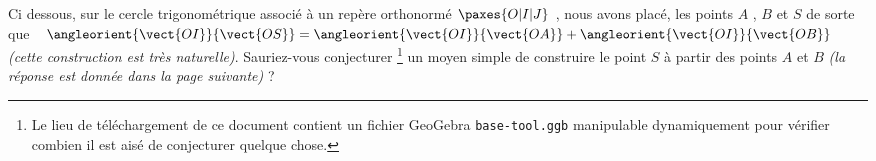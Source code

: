 Ci dessous, sur le cercle trigonométrique associé à un repère orthonormé $\paxes{O | I | J}$ , nous avons placé, les points $A$ , $B$ et $S$ de sorte que $\angleorient{\vect{OI}}{\vect{OS}} = \angleorient{\vect{OI}}{\vect{OA}} + \angleorient{\vect{OI}}{\vect{OB}}$ \emph{(cette construction est très naturelle)}.
Sauriez-vous conjecturer
\footnote{
	Le lieu de téléchargement de ce document contient un fichier GeoGebra \texttt{base-tool.ggb} manipulable dynamiquement pour vérifier combien il est aisé de conjecturer quelque chose.
}
un moyen simple de construire le point $S$ à partir des points $A$ et $B$ \emph{(la réponse est donnée dans la page suivante)} ?


\medskip

\begin{multicols}{2}
	\center


	\columnbreak


\end{multicols}
